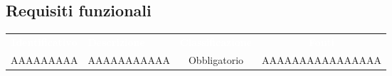 \newcommand{\ob}{Obbligatorio}
\newcommand{\de}{Desiderabile}
\newcommand{\op}{Opzionale}


\subsection{Requisiti funzionali}
{
\renewcommand{\arraystretch}{1.5}
\centering
\begin{longtable}{ c C{4cm} c c}
\textcolor{white}{\textbf{Identificativo}} & \textcolor{white}{\textbf{Descrizione}} & \textcolor{white}{\textbf{Classificazione}} & \textcolor{white}{\textbf{Fonti}}\\	

AAAAAAAAA & AAAAAAAAAAA & \ob & AAAAAAAAAAAAAAAA\\

\end{longtable}
}